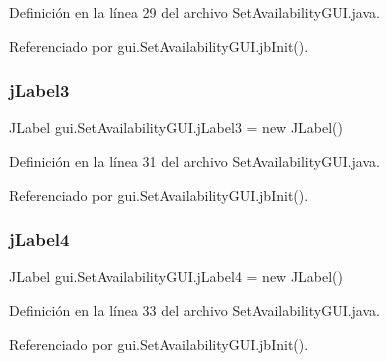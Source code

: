 Definición en la línea 29 del archivo Set\+Availability\+G\+U\+I.\+java.



Referenciado por gui.\+Set\+Availability\+G\+U\+I.\+jb\+Init().

\mbox{\label{classgui_1_1_set_availability_g_u_i_a260839d8134a704462036f00e61a334b}} 
\subsubsection{\texorpdfstring{jLabel3}{jLabel3}}
{\footnotesize\ttfamily J\+Label gui.\+Set\+Availability\+G\+U\+I.\+j\+Label3 = new J\+Label()\hspace{0.3cm}{\ttfamily [private]}}



Definición en la línea 31 del archivo Set\+Availability\+G\+U\+I.\+java.



Referenciado por gui.\+Set\+Availability\+G\+U\+I.\+jb\+Init().

\mbox{\label{classgui_1_1_set_availability_g_u_i_a6969d8917d158a3fa66153ccea58d2d5}} 
\subsubsection{\texorpdfstring{jLabel4}{jLabel4}}
{\footnotesize\ttfamily J\+Label gui.\+Set\+Availability\+G\+U\+I.\+j\+Label4 = new J\+Label()\hspace{0.3cm}{\ttfamily [private]}}



Definición en la línea 33 del archivo Set\+Availability\+G\+U\+I.\+java.



Referenciado por gui.\+Set\+Availability\+G\+U\+I.\+jb\+Init().

\mbox{\label{classgui_1_1_set_availability_g_u_i_adaff504659254070536d646b331e2e5f}} 
